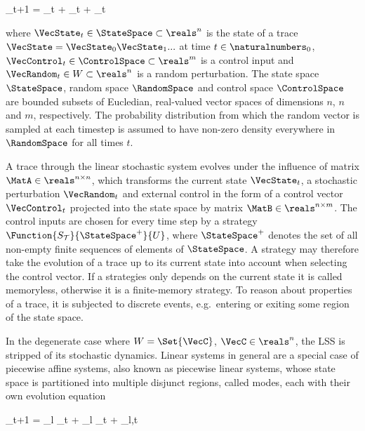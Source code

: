     \startformula
        \VecState_{t+1} = \MatA \VecState_t + \MatB \VecControl_t + \VecRandom_t \EndComma
    \stopformula

    where $\VecState_t \in \StateSpace \subset \reals^n$ is the state of a trace $\VecState = \VecState_0 \VecState_1 ...$ at time $t \in \naturalnumbers_0$,
    $\VecControl_t \in \ControlSpace \subset \reals^m$ is a control input and
    $\VecRandom_t \in W \subset \reals^n$ is a random perturbation.
    The state space $\StateSpace$, random space $\RandomSpace$ and control space $\ControlSpace$ are bounded subsets of Eucledian, real-valued vector spaces of dimensions $n$, $n$ and $m$, respectively.
    The probability distribution from which the random vector is sampled at each timestep is assumed to have non-zero density everywhere in $\RandomSpace$ for all times $t$.

    A trace through the linear stochastic system evolves under the influence of matrix $\MatA \in \reals^{n \times n}$, which transforms the current state $\VecState_t$, a stochastic perturbation $\VecRandom_t$ and external control in the form of a control vector $\VecControl_t$ projected into the state space by matrix $\MatB \in \reals^{n \times m}$.
    The control inputs are chosen for every time step by a strategy $\Function{S_\mathcal{T}}{\StateSpace^+}{U}$, where $\StateSpace^+$ denotes the set of all non-empty finite sequences of elements of $\StateSpace$.
    A strategy may therefore take the evolution of a trace up to its current state into account when selecting the control vector.
    If a strategies only depends on the current state it is called memoryless, otherwise it is a finite-memory strategy.
    To reason about properties of a trace, it is subjected to discrete events, e.g.\ entering or exiting some region of the state space.

\stopsubsection


\startsubsection[title={Related Systems}]

    In the degenerate case where $W = \Set{\VecC}$, $\VecC \in \reals^n$, the LSS is stripped of its stochastic dynamics.
    Linear systems in general are a special case of piecewise affine systems, also known as piecewise linear systems, whose state space is partitioned into multiple disjunct regions, called modes, each with their own evolution equation

    \startformula
        \VecState_{t+1} = \MatA_l \VecState_t + \MatB_l \VecControl_t + \VecRandom_{l,t} \EndComma
    \stopformula

